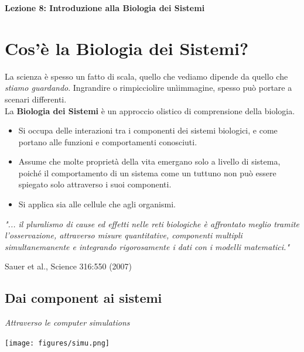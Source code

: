 \documentclass{article}
\begin{document}
\begin{titlepage}
    \begin{center}
        \vspace*{1cm}
        \LARGE
        \textbf{Lezione 8: Introduzione alla Biologia dei Sistemi}

    \end{center}
\end{titlepage}
\setcounter{page}{79}
\section{Cos'è la Biologia dei Sistemi?}
La scienza è spesso un fatto di scala, quello che vediamo dipende da quello che \textit{stiamo guardando}.
Ingrandire o rimpicciolire unìimmagine, spesso può portare a scenari differenti.\\
La \textbf{Biologia dei Sistemi} è un approccio olistico di comprensione della biologia.
\begin{itemize}
    \item Si occupa delle interazioni tra i componenti dei sistemi biologici, e come portano alle funzioni e comportamenti conosciuti.
    \item Assume che molte proprietà della vita emergano solo a livello di sistema, poiché il comportamento di un sistema come un tuttuno non può essere spiegato solo attraverso i suoi componenti.
    \item Si applica sia alle cellule che agli organismi.
\end{itemize}
\begin{center}
    \textit{"... il pluralismo di cause ed effetti nelle reti biologiche è affrontato meglio tramite l'osservazione, attraverso misure quantitative,
    componenti multipli simultanemanente e integrando rigorosamente i dati con i modelli matematici."}
\end{center}
\begin{flushright}
    Sauer et al., Science 316:550 (2007)
\end{flushright}
\subsection{Dai component ai sistemi}
\textit{Attraverso le computer simulations}
\begin{center}
    \texttt{[image: figures/simu.png]}
\end{center}
\end{document}

